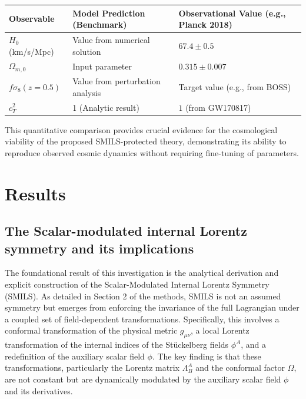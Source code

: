 \documentclass[twocolumn]{aastex631}
\begin{document}
\begin{enumerate}
    \begin{center}
    \begin{tabular}{|l|l|l|}
    \hline
    \textbf{Observable} & \textbf{Model Prediction (Benchmark)} & \textbf{Observational Value (e.g., Planck 2018)} \\
    \hline
    $H_0$ (km/s/Mpc) & Value from numerical solution & $67.4 \pm 0.5$ \\
    $\Omega_{m,0}$ & Input parameter & $0.315 \pm 0.007$ \\
    $f\sigma_8(z=0.5)$ & Value from perturbation analysis & Target value (e.g., from BOSS) \\
    $c_T^2$ & 1 (Analytic result) & $1$ (from GW170817) \\
    \hline
    \end{tabular}
    \end{center}
    This quantitative comparison provides crucial evidence for the cosmological viability of the proposed SMILS-protected theory, demonstrating its ability to reproduce observed cosmic dynamics without requiring fine-tuning of parameters.
\end{enumerate}

\section{Results}
\label{sec:results}
\subsection{The Scalar-modulated internal Lorentz symmetry and its implications}
The foundational result of this investigation is the analytical derivation and explicit construction of the Scalar-Modulated Internal Lorentz Symmetry (SMILS). As detailed in Section 2 of the methods, SMILS is not an assumed symmetry but emerges from enforcing the invariance of the full Lagrangian under a coupled set of field-dependent transformations. Specifically, this involves a conformal transformation of the physical metric $g_{\mu\nu}$, a local Lorentz transformation of the internal indices of the Stückelberg fields $\phi^A$, and a redefinition of the auxiliary scalar field $\phi$. The key finding is that these transformations, particularly the Lorentz matrix $\Lambda^A_B$ and the conformal factor $\Omega$, are not constant but are dynamically modulated by the auxiliary scalar field $\phi$ and its derivatives.
\end{document}
